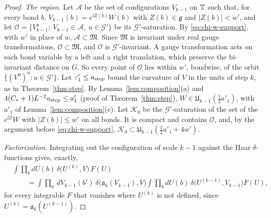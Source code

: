\begin{proof}
\emph{The region.} Let $\mathscr A$ be the set of configurations $V_{k-1}$ on $\mathbb T$ such that, for every bond $b$, $V_{k-1}(b)=e^{\ii Z(b)}W(b)$ with $Z(b)\in\mathfrak g$ and $|Z(b)|<w'$, and let $\mathscr O=\{V_{k-1}^u:\ V_{k-1}\in\mathscr A,\ u\in\mathcal G'\}$ be its $\mathcal G'$-saturation. By \eqref{eq:chi-w-support}, with $w'$ in place of $w$, $\mathscr A\subset\mathfrak M$. Since $\mathfrak M$ is invariant under real gauge transformations, $\mathscr O\subset\mathfrak M$, and $\mathscr O$ is $\mathcal G'$-invariant. A gauge transformation acts on each bond variable by a left and a right translation, which preserve the bi-invariant distance on $G$. So every point of $\mathscr O$ lies within $w'$, bondwise, of the orbit $\{(V^0)^u:u\in\mathcal G'\}$. Let $\varepsilon'_1\le a_{\rm step}$ bound the curvature of $V$ in the units of step $k$, as in Theorem~\ref{thm:step}. By Lemma~\ref{lem:composition}(a) and $4(C_*+1)L^{-2}a_{\rm step}\le a'_1$ (proof of Theorem~\ref{thm:step}), $W\in\mathfrak U_{k-1}(\frac12a'_1)$, with $a'_1$ of Lemma~\ref{lem:composition}(c). Let $\mathcal K_0$ be the $\mathcal G'$-saturation of the set of the $e^{\ii Z}W$ with $|Z(b)|\le w'$ on all bonds. It is compact and contains $\mathscr O$, and, by the argument before \eqref{eq:chi-w-support}, $\mathcal K_0\subset\mathfrak U_{k-1}(\frac12a'_1+4w')$.

\emph{Factorization.} Integrating out the configuration of scale $k-1$ against the Haar $\delta$-functions gives, exactly,
\[
\begin{aligned}
&\int\prod_b dU(b)\,\delta\big(U^{(k)},V\big)\,F(U)\\
&\qquad=\int\prod_{b'}dV_{k-1}(b')\ \delta\big(\mathfrak a_k(V_{k-1}),V\big)\int\prod_bdU(b)\,\delta\big(U^{(k-1)},V_{k-1}\big)F(U),
\end{aligned}
\]
for every integrable $F$ that vanishes where $U^{(k)}$ is not defined, since $U^{(k)}=\mathfrak a_k(U^{(k-1)})$.


\end{proof}

